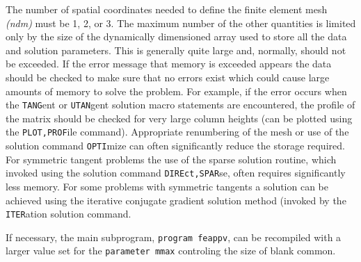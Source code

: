 The number of spatial coordinates needed to define the finite
element mesh {\it (ndm)} must be 1, 2, or 3.  The maximum
number of the other quantities is limited only by the size of the
dynamically dimensioned array used to store all the data and solution
parameters.  This is generally quite large and, normally, should not
be exceeded.  If the error message that memory is exceeded appears the
data should be checked to make sure that no errors exist which could
cause large amounts of memory to solve the problem. For example, if the error
occurs when the {\tt TANG}ent or {\tt UTAN}gent
solution macro statements
are encountered, the profile of the matrix should be checked for very
large column heights (can be plotted using the {\tt PLOT,PROF}ile command).
Appropriate renumbering of the mesh or use of the
solution command {\tt OPTI}mize can
often significantly reduce the storage required.
For symmetric tangent problems the use of the sparse solution routine,
which invoked using the solution command {\tt DIREct,SPAR}se, often requires
significantly less memory.  For some problems with symmetric tangents
a solution can be achieved using the iterative conjugate gradient solution
method (invoked by the {\tt ITER}ation solution command.

If necessary, the
main subprogram, {\tt program feappv}, can be recompiled with a larger
value set for the {\tt parameter mmax} controling the size of blank common.
\vfil\eject
